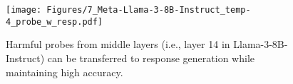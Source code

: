 \begin{figure}[t]
  \centering
  \texttt{[image: Figures/7\_Meta-Llama-3-8B-Instruct\_temp-4\_probe\_w\_resp.pdf]}
  \caption{Harmful probes from middle layers (i.e., layer 14 in Llama-3-8B-Instruct) can be transferred to response generation while maintaining high accuracy.}
  \label{fig:probe_in_resp}
\end{figure}
